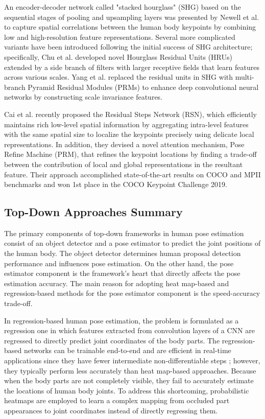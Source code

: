 An encoder-decoder network called "stacked hourglass" (SHG) based on the sequential stages of pooling and upsampling layers was presented by Newell et al. \cite{newell_stacked_2016} to capture spatial correlations between the human body keypoints by combining low and high-resolution feature representations. Several more complicated variants have been introduced following the initial success of SHG architecture; specifically, Chu et al. \cite{chu_multi-context_2017} developed novel Hourglass Residual Units (HRUs) extended by a side branch of filters with larger receptive fields that learn features across various scales. Yang et al. \cite{yang_learning_2017} replaced the residual units in SHG with multi-branch Pyramid Residual Modules (PRMs) to enhance deep convolutional neural networks by constructing scale invariance features. 

Cai et al. \cite{vedaldi_learning_2020} recently proposed the Residual Steps Network (RSN), which efficiently maintains rich low-level spatial information by aggregating intra-level features with the same spatial size to localize the keypoints precisely using delicate local representations. In addition, they devised a novel attention mechanism, Pose Refine Machine (PRM), that refines the keypoint locations by finding a trade-off between the contribution of local and global representations in the resultant feature. Their approach accomplished state-of-the-art results on COCO and MPII benchmarks and won 1st place in the COCO Keypoint Challenge 2019.


\subsection*{Top-Down Approaches Summary}

The primary components of top-down frameworks in human pose estimation consist of an object detector and a pose estimator to predict the joint positions of the human body. The object detector determines human proposal detection performance and influences pose estimation. On the other hand, the pose estimator component is the framework's heart that directly affects the pose estimation accuracy. The main reason for adopting heat map-based and regression-based methods for the pose estimator component is the speed-accuracy trade-off. 

In regression-based human pose estimation, the problem is formulated as a regression one in which features extracted from convolution layers of a CNN are regressed to directly predict joint coordinates of the body parts. The regression-based networks can be trainable end-to-end and are efficient in real-time applications since they have fewer intermediate non-differentiable steps \cite{liu_cascaded_2018, eichner_human_2012, felzenszwalb_pictorial_2005, girdhar_detect-and-track_2018}; however, they typically perform less accurately than heat map-based approaches. Because when the body parts are not completely visible, they fail to accurately estimate the locations of human body joints. To address this shortcoming, probabilistic heatmaps are employed to learn a complex mapping from occluded part appearances to joint coordinates instead of directly regressing them. 

